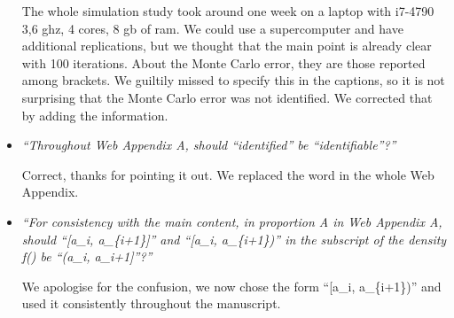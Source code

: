\documentclass[11pt]{article}
\begin{document}
\begin{itemize}
The whole simulation study took around one week on a laptop with i7-4790 3,6 ghz, 4 cores, 8 gb of ram. We could use a supercomputer and have additional replications, but we thought that the main point is already clear with 100 iterations. About the Monte Carlo error, they are those reported among brackets. We guiltily missed to specify this in the captions, so it is not surprising that the Monte Carlo error was not identified. We corrected that by adding the information.


\item \emph{``Throughout Web Appendix A, should “identified” be “identifiable”?''}

Correct, thanks for pointing it out. We replaced the word in the whole Web Appendix.


\item \emph{``For consistency with the main content, in proportion A in Web Appendix A, should ``[a\_i, a\_\{i+1\}]'' and ``[a\_i, a\_\{i+1\})'' in the subscript of the density f() be ``(a\_i, a\_{i+1}]''?''}

We apologise for the confusion, we now chose the form ``[a\_i, a\_\{i+1\})'' and used it consistently throughout the manuscript.

\end{itemize}
\end{document}
